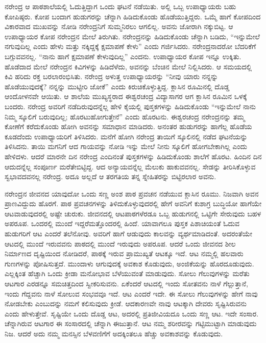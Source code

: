 ನರೇಂದ್ರ ಆ ಪಾಠಶಾಲೆಯಲ್ಲಿ ಓದುತ್ತಿದ್ದಾಗ ಒಂದು ಘಟನೆ ನಡೆಯಿತು. ಅಲ್ಲಿ ಒಬ್ಬ ಉಪಾಧ್ಯಾಯರು ಬಹು ಕೋಪಿಷ್ಠರು. ಕೋಪ ಬಂದಾಗ ಹುಡುಗರನ್ನು ಚೆನ್ನಾಗಿ ಹಿಡಿದುಕೊಂಡು ಹೊಡೆಯುತ್ತಿದ್ದರು. ಒಮ್ಮೆ ಹಾಗೆ ಕೋಪದಿಂದ ವಿಕಾರವಾದ ಮುಖವನ್ನು ನೋಡಿ ನರೇಂದ್ರನಿಗೆ ಸುಮ್ಮನಿರಲು ಆಗಲಿಲ್ಲ. ಅವನು ಜೋರಾಗಿ ನಕ್ಕುಬಿಟ್ಟ. ಆ ಉಪಾಧ್ಯಾಯರ ಕೋಪ ನರೇಂದ್ರನ ಮೇಲೆ ತಿರುಗಿತು. ನರೇಂದ್ರನನ್ನು ಹಿಡಿದುಕೊಂಡು ಚೆನ್ನಾಗಿ ಬಡಿದು, “ಇನ್ನುಮೇಲೆ ನಗುವುದಿಲ್ಲ ಎಂದು ಹೇಳು ಮತ್ತು ನಕ್ಕಿದ್ದಕ್ಕೆ ಕ್ಷಮಾಪಣೆ ಕೇಳು” ಎಂದು ಗರ್ಜಿಸಿದರು. ನರೇಂದ್ರನಾದರೋ ಬೆದರಿಕೆಗೆ ಬಗ್ಗುವವನಲ್ಲ. “ನಾನು ಹಾಗೆ ಕ್ಷಮಾಪಣೆ ಕೇಳುವುದಿಲ್ಲ” ಎಂದನು. ಉಪಾಧ್ಯಾಯರ ಕೋಪ ಇನ್ನೂ ಉಕ್ಕಿತು. ಹೊಡೆದಾದ ಮೇಲೆ ನರೇಂದ್ರನ ಕಿವಿಗಳನ್ನು ಹಿಡಿದೆಳೆದು, ಅವನನ್ನು ಬೆಂಚಿನ ಮೇಲೆ ನಿಲ್ಲಿಸಿದರು. ಆ ಸಮಯದಲ್ಲಿ ಕಿವಿ ಹರಿದು ರಕ್ತ ಬರಲಾರಂಭಿಸಿತು. ನರೇಂದ್ರ ಅಳುತ್ತ ಉಪಾಧ್ಯಾಯರನ್ನು “ನೀವು ಯಾರು ನನ್ನನ್ನು ಹೊಡೆಯುವುದಕ್ಕೆ? ನನ್ನನ್ನು ಮುಟ್ಟೀರಿ ಜೋಕೆ” ಎಂದು ಕಿರುಚಿಕೊಳ್ಳುತ್ತಿದ್ದ. ಕ್ಲಾಸಿನ ರೂಮಿನಲ್ಲಿ ದೊಡ್ಡ ಆಂದೋಳನವೇ ಆಯಿತು. ಆ ಶಾಲೆಯ ಮುಖ್ಯಸ್ಥರಾದ ಈಶ್ವರಚಂದ್ರ ವಿದ್ಯಾಸಾಗರ ಆಗ ಕ್ಲಾಸಿನ ರೂಮಿನ ಒಳಕ್ಕೆ ಬಂದರು. ನರೇಂದ್ರ ಅವರಿಗೆ ನಡೆದಿರುವುದನ್ನೆಲ್ಲ ಹೇಳಿ ಕೈಯಲ್ಲಿ ಪುಸ್ತಕಗಳನ್ನು ಹಿಡಿದುಕೊಂಡು “ಇನ್ನುಮೇಲೆ ನಾನು ನಿಮ್ಮ ಸ್ಕೂಲಿಗೆ ಬರುವುದಿಲ್ಲ; ಹೊರಟುಹೋಗುತ್ತೇನೆ” ಎಂದು ಹೊರಟನು. ಈಶ್ವರಚಂದ್ರ ನರೇಂದ್ರನನ್ನು ತಮ್ಮ ಕೋಣೆಗೆ ಕರೆದುಕೊಂಡು ಹೋಗಿ ಅವನನ್ನು ಸಮಾಧಾನ ಮಾಡಿದರು. ಅನಂತರ ಹುಡುಗರನ್ನು ಹಾಗೆಲ್ಲ ಹೊಡೆಯ ಕೂಡದೆಂದು ಉಪಾಧ್ಯಾಯರಿಗೆ ತಿಳಿಸಿದರು. ಮನೆಗೆ ಹೋಗಿ ನರೇಂದ್ರ ತಾಯಿಗೆ ಸ್ಕೂಲಿನಲ್ಲಿ ನಡೆದ ಘಟನೆಯನ್ನು ತಿಳಿಸಿದನು. ತಾಯಿ ಮಗನಿಗೆ ಆದ ಗಾಯವನ್ನು ನೋಡಿ ಇನ್ನು ಮೇಲೆ ನೀನು ಸ್ಕೂಲಿಗೆ ಹೋಗಬೇಕಾಗಿಲ್ಲ ಎಂದು ಹೇಳಿದಳು. ಆದರೆ ಮಾರನೇ ದಿನ ನರೇಂದ್ರ ಎಂದಿನಂತೆ ಪುಸ್ತಕಗಳನ್ನು ಹಿಡಿದುಕೊಂಡು ಶಾಲೆಗೆ ಹೊರಟ. ಹಿಂದಿನ ದಿನ ಆದುದನ್ನೆಲ್ಲ ಸಂಪೂರ್ಣ ಮರೆತೇಬಿಟ್ಟಿದ್ದ. ಆದ ಅನ್ಯಾಯವನ್ನೆಲ್ಲ ಮೆಲುಕು ಹಾಕುವವನಲ್ಲ. ಸೇಡನ್ನು ತೀರಿಸಿಕೊಳ್ಳುವ ಸ್ವಭಾವದವನಲ್ಲ ನರೇಂದ್ರ. ಅದೂ ಅಲ್ಲದೆ ಆ ತರಗತಿಯ ತನ್ನ ಸ್ನೇಹಿತರನ್ನು ಬಿಟ್ಟಿರಲಾರ ಅವನು.

ನರೇಂದ್ರನ ಜೀವನದ ಯಾವುದೋ ಒಂದು ಸಣ್ಣ ಅಂಶ ಪಾಠ ಪ್ರವಚನ ನಡೆಯುವ ಕ್ಲಾಸಿನ ರೂಮು. ನಿಜವಾಗಿ ಅವನ ಪ್ರಾಣವಿದ್ದುದು ಹೊರಗೆ. ಪಾಠ ಪ್ರವಚನಗಳನ್ನು ತಿಳಿದುಕೊಳ್ಳುವುದರಲ್ಲಿ ಹೇಗೆ ಅವನಿಗೆ ಕುಶಾಗ್ರ ಬುದ್ಧಿಯೋ ಹಾಗೆಯೇ ಆಟವಾಡುವುದರಲ್ಲಿ ಅಷ್ಟೇ ಚುರುಕು. ಜೀವನದಲ್ಲಿ ಆಟಪಾಠಗಳೆರಡೂ ಒಬ್ಬ ಹುಡುಗನಲ್ಲಿ ಒಟ್ಟಿಗೇ ಸೇರುವುದು ಬಹಳ ಅಪರೂಪ. ಒಂದರಲ್ಲಿ ಮುಂದೆ ಇದ್ದರೆ\break ಮತ್ತೊಂದರಲ್ಲಿ ಹಿಂದೆ. ಯಾವಾಗಲೂ ಪುಸ್ತಕ ಪಿಶಾಚಿಯಂತೆ ಓದುವ ಹುಡುಗರಿಗೆ ಆಟ ಎಂದರೆ ತಲೆನೋವು. ಅವರಿಗೆ ಹಾಗೆ ಆಡುವುದು ಕಾಲವನ್ನು ವ್ಯರ್ಥಮಾಡಿದಂತೆ. ಅದರಂತೆಯೇ ಆಟದಲ್ಲಿ ಮುಂದೆ ಇರುವವನು ಪಾಠದಲ್ಲಿ ಮುಂದೆ ಇರುವುದು ಅಪರೂಪ. ಆದರೆ ಒಂದು ಜೀವನದ ಶೀಲ ನಿರ್ಮಾಣದ ದೃಷ್ಟಿಯಿಂದ ನೋಡಿದರೆ, ಪಾಠಕ್ಕೆ ಇರುವ ಪ್ರಾಮುಖ್ಯತೆ ಆಟಕ್ಕೂ ಇದೆ. ಆಟ ನಮ್ಮಲ್ಲಿ ಹಲವಾರು ಗುಣಗಳನ್ನು ಪೋಷಿಸುತ್ತದೆ. ಮುಂದಾಳು ಆಗುವುದಕ್ಕೆ ಅವಕಾಶ ಕೊಡುವುದು, ಅಂಜಿಕೆಯನ್ನು ಹೊರದೂಡುವುದು. ಎಲ್ಲಕ್ಕಿಂತ ಹೆಚ್ಚಾಗಿ ಒಂದು ಕ್ರೀಡಾ ಮನೋಭಾವ ಬೆಳೆಯುವಂತೆ ಮಾಡುವುದು. ಸೋಲು ಗೆಲುವುಗಳನ್ನು ಮರೆತು ಆಟಗಾರ ಎರಡನ್ನೂ ಸಮಚಿತ್ತದಿಂದ ಸ್ವೀಕರಿಸುವನು. ಏಕೆಂದರೆ ಆಟದಲ್ಲಿ ಇಂದು ಸೋತವನು ನಾಳೆ ಗೆಲ್ಲುತ್ತಾನೆ, ಇಂದು ಗೆದ್ದವನು ನಾಳೆ ಸೋಲುವ ಸಂಭವವೂ ಇದೆ. ಆಟ ಎಂದರೆ ಇದೇ. ಈ ಸೋಲು ಗೆಲುವುಗಳನ್ನು ಹೇಗೆ ನಾವು ನೋಡಬೇಕು ಎಂಬುದನ್ನು ನಮಗೆ ಕಲಿಸುವುದು ಕ್ರೀಡೆ. ಆದಕಾರಣವೇ ನಾವು ಆಟಕ್ಕಾಗಿ ದೇವರು ಸೃಷ್ಟಿಸಿರುವನು ಎಂದು ಹೇಳುತ್ತೇವೆ. ಸೃಷ್ಟಿಯೇ ಒಂದು ದೊಡ್ಡ ಆಟ, ಅದರಲ್ಲಿ ಪ್ರತಿಜೀವಿಯದೂ ಒಂದು ಸಣ್ಣ ಆಟ. ಇದೇ ಸಂಸಾರ. ಚೆನ್ನಾಗಿರುವ ಆಟಗಾರ ಈ ಸಂಸಾರದಲ್ಲಿ ಚೆನ್ನಾಗಿ ಈಜುತ್ತಾನೆ. ಆಟ ನಮ್ಮ ಶರೀರವನ್ನು ಗಟ್ಟಿಮುಟ್ಟಾಗಿ ಮಾಡುವುದು ನಿಜ. ಆದರೆ ಅದು ನಮ್ಮ ಮನಸ್ಸಿನ ಬೆಳವಣಿಗೆಗೆ ಅದಕ್ಕಿಂತಲೂ ಹೆಚ್ಚು ಅವಕಾಶವನ್ನು ಕೊಡುವುದು.

